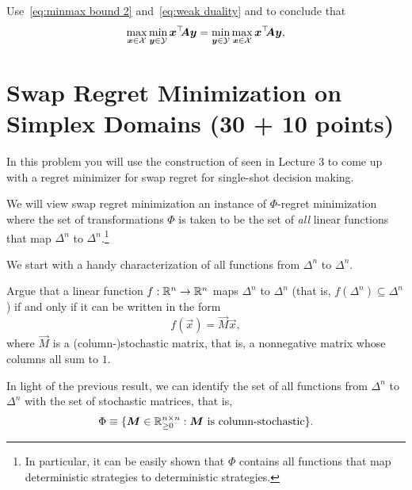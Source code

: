 \documentclass{homework}
\begin{document}
\begin{problem}[2 points]
    Use~\eqref{eq:minmax bound 2} and~\eqref{eq:weak duality} and to conclude that
    \[
        \max_{\bm{x}\in\mathcal{X}}\min_{\bm{y}\in\mathcal{Y}} \bm{x}^\top\!\! \bm{A} \bm{y} = \min_{\bm{y}\in\mathcal{Y}}\max_{\bm{x}\in\mathcal{X}} \bm{x}^\top\!\! \bm{A} \bm{y},
    \]
\end{problem}
\begin{solution}
\end{solution}

\section{Swap Regret Minimization on Simplex Domains (30 + 10 points)}

In this problem you will use the construction of \citet{Gordon08:No} seen in Lecture 3
to come up with a regret minimizer for swap regret for single-shot decision making.

We will view swap regret minimization an instance of $\Phi$-regret minimization
where the set of transformations $\Phi$ is taken to be the set of \emph{all} linear functions 
that map $\Delta^n$ to $\Delta^n$.\footnote{In particular, it can be easily shown that $\Phi$ contains all functions that map deterministic strategies to deterministic strategies.}

We start with a handy characterization of all functions from $\Delta^n$ to $\Delta^n$.

\begin{problem}[7 points]
    Argue that a linear function $f: \mathbb{R}^n \to \mathbb{R}^n$ maps $\Delta^n$ to $\Delta^n$ (that is, $f(\Delta^n) \subseteq \Delta^n$) if and only if it can be written in the form
    \[
        f(\vec{x}) = \vec{M} \vec{x},
    \]
    where $\vec{M}$ is a (column-)stochastic matrix, that is, a nonnegative matrix whose columns all sum to $1$.%
\end{problem}
\begin{solution}
\end{solution}

In light of the previous result, we can identify the set of all functions from $\Delta^n$ to $\Delta^n$ with the set of
stochastic matrices, that is,
\[
    \Phi \equiv \{\bm{M}\in\mathbb{R}_{\ge 0}^{n\times n} : \bm{M} \text{ is column-stochastic}\}.
\]
\end{document}
